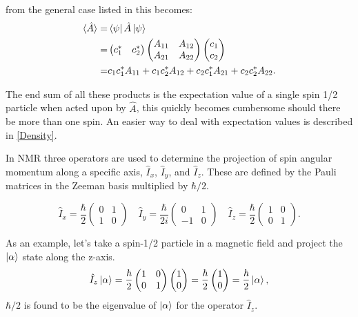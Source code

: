 from the general case listed in  this becomes:
\begin{align}\label{eqn:expectation}
  \langle\hat{A}\rangle =& \bra{\psi}\hat{A}\ket{\psi}\\
  =& \begin{pmatrix}
    c_1^* & c_2^*
\end{pmatrix}
\begin{pmatrix}
A_{11} & A_{12}\\
A_{21} & A_{22}
\end{pmatrix}
\begin{pmatrix}
  c_1\\
  c_2
\end{pmatrix}\\
=& c_1c_1^*A_{11} + c_1c_2^*A_{12} + c_2c_1^*A_{21} + c_2c_2^*A_{22}.
\end{align}

The end sum of all these products is the expectation value of a single spin 1/2 particle when
acted upon by $\hat{A}$, this quickly becomes cumbersome should there be more than one spin. An easier
way to deal with expectation values is described in \ref{Density}.

In NMR three operators are used to determine the projection of spin angular momentum along a
specific axis, $\hat{I}_x$, $\hat{I}_y$, and $\hat{I}_z$. These are defined by the
Pauli matrices in the Zeeman basis multiplied by $\hbar/2$.

\begin{equation}
  \hat{I}_x=\frac{\hbar}{2}\begin{pmatrix}
    0 & 1\\
    1 & 0
\end{pmatrix}\quad
\hat{I}_y=\frac{\hbar}{2i}\begin{pmatrix}
  0 & 1\\
  -1 & 0
\end{pmatrix}\quad
\hat{I}_z=\frac{\hbar}{2}\begin{pmatrix}
  1 & 0\\
  0 & 1
\end{pmatrix}.
\end{equation}

As an example, let's take a spin-1/2 particle in a magnetic field
and project the $\ket{\alpha}$ state along the z-axis.
\begin{equation}\label{eqn:operators}
  \hat{I}_z\ket{\alpha} = \frac{\hbar}{2}\begin{pmatrix}
    1 & 0\\
    0 & 1
\end{pmatrix}
\begin{pmatrix}
  1\\
  0
\end{pmatrix} = \frac{\hbar}{2}\begin{pmatrix}
  1\\
  0
\end{pmatrix} = \frac{\hbar}{2}\ket{\alpha},
\end{equation}
$\hbar/2$ is found to be the eigenvalue of $\ket{\alpha}$ for the operator $\hat{I}_z$.

